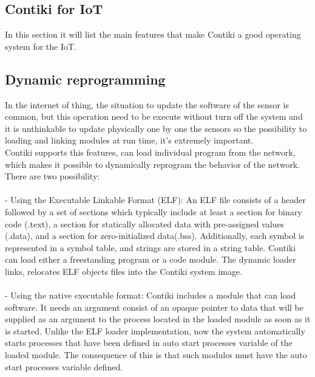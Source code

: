 \documentclass[a4paper,10pt]{article}
\begin{document}
\begin{multicols}{2}
\section{Contiki for IoT}

In this section it will list the main features that make Contiki a good operating system for the IoT.


\subsection{Dynamic reprogramming}

In the internet of thing, the situation to update the software of the sensor is common, but this operation need to be execute without turn off the system and it is unthinkable to update physically one by one the sensors so the possibility to loading and linking modules at run time, it's extremely important.\\
Contiki supports this features, can load individual program from the network, which makes it possible to dynamically reprogram the behavior of the network. There are two possibility:\\\\
- Using the Executable Linkable Format (ELF): An ELF file consists of a header followed by a set of sections which typically include at least a section for binary code (.text), a section for statically allocated data with pre-assigned values (.data), and a section for zero-initialized data(.bss). Additionally, each symbol is represented in a symbol table, and strings are stored in a string table. Contiki can load either a freestanding program or a code module. The dynamic loader links, relocates ELF objects files into the Contiki system image.\\\\

- Using the native executable format: Contiki includes a module that can load software. It needs an argument consist of an opaque pointer to data that will be supplied as an argument to the process located in the loaded module as soon as it is started.
Unlike the ELF loader implementation, now the system automatically starts processes that have been defined in auto start processes variable of the loaded module. The consequence of this is that such modules must have the auto start processes variable defined.


\end{multicols}
\end{document}
